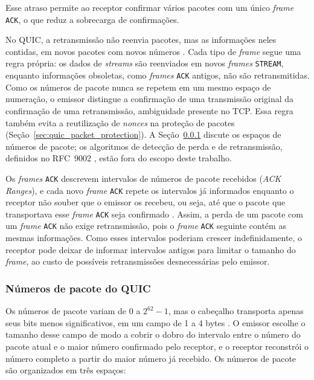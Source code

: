 Esse atraso permite ao receptor confirmar vários pacotes com um único \textit{frame} \texttt{ACK}, o que reduz a sobrecarga de confirmações.

No QUIC, a retransmissão não reenvia pacotes, mas as informações neles contidas, em novos pacotes com novos números \citep{rfc9002}. Cada tipo de \textit{frame} segue uma regra própria: os dados de \textit{streams} são reenviados em novos \textit{frames} \texttt{STREAM}, enquanto informações obsoletas, como \textit{frames} \texttt{ACK} antigos, não são retransmitidas. Como os números de pacote nunca se repetem em um mesmo espaço de numeração, o emissor distingue a confirmação de uma transmissão original da confirmação de uma retransmissão, ambiguidade presente no TCP. Essa regra também evita a reutilização de \textit{nonces} na proteção de pacotes (Seção~\ref{sec:quic_packet_protection}). A Seção~\ref{sec:quic_packet_numbers} discute os espaços de números de pacote; os algoritmos de detecção de perda e de retransmissão, definidos no RFC~9002 \citep{rfc9002}, estão fora do escopo deste trabalho.

Os \textit{frames} \texttt{ACK} descrevem intervalos de números de pacote recebidos (\textit{ACK Ranges}), e cada novo \textit{frame} \texttt{ACK} repete os intervalos já informados enquanto o receptor não souber que o emissor os recebeu, ou seja, até que o pacote que transportava esse \textit{frame} \texttt{ACK} seja confirmado \citep{rfc9000}. Assim, a perda de um pacote com um \textit{frame} \texttt{ACK} não exige retransmissão, pois o \textit{frame} \texttt{ACK} seguinte contém as mesmas informações. Como esses intervalos poderiam crescer indefinidamente, o receptor pode deixar de informar intervalos antigos para limitar o tamanho do \textit{frame}, ao custo de possíveis retransmissões desnecessárias pelo emissor.

\subsubsection{Números de pacote do QUIC}
\label{sec:quic_packet_numbers}

Os números de pacote variam de 0 a $2^{62}-1$, mas o cabeçalho transporta apenas seus bits menos significativos, em um campo de 1 a 4 bytes \citep{rfc9000}. O emissor escolhe o tamanho desse campo de modo a cobrir o dobro do intervalo entre o número do pacote atual e o maior número confirmado pelo receptor, e o receptor reconstrói o número completo a partir do maior número já recebido. Os números de pacote são organizados em três espaços:

